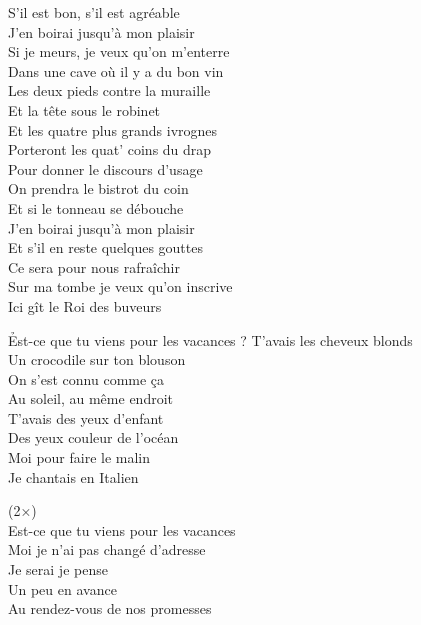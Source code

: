 \documentclass{novel}
\begin{document}
{\begin{minipage}[t][0.5\textheight][t]{\textwidth}
\begin{multicols}{2}
S'il est bon, s'il est agréable \\
J'en boirai jusqu'à mon plaisir \\

Si je meurs, je veux qu'on m'enterre \\
Dans une cave où il y a du bon vin \\

Les deux pieds contre la muraille \\
Et la tête sous le robinet \\

Et les quatre plus grands ivrognes \\
Porteront les quat' coins du drap \\

Pour donner le discours d'usage \\
On prendra le bistrot du coin \\

Et si le tonneau se débouche \\
J'en boirai jusqu'à mon plaisir \\

Et s'il en reste quelques gouttes \\
Ce sera pour nous rafraîchir \\

Sur ma tombe je veux qu'on inscrive \\
Ici gît le Roi des buveurs
\end{multicols}
\end{minipage}
}

\newpage
\normalsize
\h*{Est-ce que tu viens pour les vacances ?}
T'avais les cheveux blonds \\
Un crocodile sur ton blouson \\
On s'est connu comme ça \\
Au soleil, au même endroit \\
T'avais des yeux d'enfant \\
Des yeux couleur de l'océan \\
Moi pour faire le malin \\
Je chantais en Italien \\

\begin{bfseries}
[Refrain:] (2×)\\
Est-ce que tu viens pour les vacances \\
Moi je n'ai pas changé d'adresse \\
Je serai je pense \\
Un peu en avance \\
Au rendez-vous de nos promesses \\
\end{bfseries}
\end{document}
